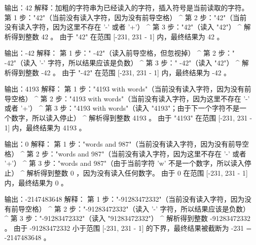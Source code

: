 输出：42
解释：加粗的字符串为已经读入的字符，插入符号是当前读取的字符。
第 1 步："42"（当前没有读入字符，因为没有前导空格）
         ^
第 2 步："42"（当前没有读入字符，因为这里不存在 '-' 或者 '+'）
         ^
第 3 步："42"（读入 "42"）
           ^
解析得到整数 42 。
由于 "42" 在范围 [-231, 231 - 1] 内，最终结果为 42 。

输出：-42
解释：
第 1 步："   -42"（读入前导空格，但忽视掉）
            ^
第 2 步："   -42"（读入 '-' 字符，所以结果应该是负数）
             ^
第 3 步："   -42"（读入 "42"）
               ^
解析得到整数 -42 。
由于 "-42" 在范围 [-231, 231 - 1] 内，最终结果为 -42 。

输出：4193
解释：
第 1 步："4193 with words"（当前没有读入字符，因为没有前导空格）
         ^
第 2 步："4193 with words"（当前没有读入字符，因为这里不存在 '-' 或者 '+'）
         ^
第 3 步："4193 with words"（读入 "4193"；由于下一个字符不是一个数字，所以读入停止）
             ^
解析得到整数 4193 。
由于 "4193" 在范围 [-231, 231 - 1] 内，最终结果为 4193 。

输出：0
解释：
第 1 步："words and 987"（当前没有读入字符，因为没有前导空格）
         ^
第 2 步："words and 987"（当前没有读入字符，因为这里不存在 '-' 或者 '+'）
         ^
第 3 步："words and 987"（由于当前字符 'w' 不是一个数字，所以读入停止）
         ^
解析得到整数 0 ，因为没有读入任何数字。
由于 0 在范围 [-231, 231 - 1] 内，最终结果为 0 。

输出：-2147483648
解释：
第 1 步："-91283472332"（当前没有读入字符，因为没有前导空格）
         ^
第 2 步："-91283472332"（读入 '-' 字符，所以结果应该是负数）
          ^
第 3 步："-91283472332"（读入 "91283472332"）
                     ^
解析得到整数 -91283472332 。
由于 -91283472332 小于范围 [-231, 231 - 1] 的下界，最终结果被截断为 -231 = -2147483648 。
